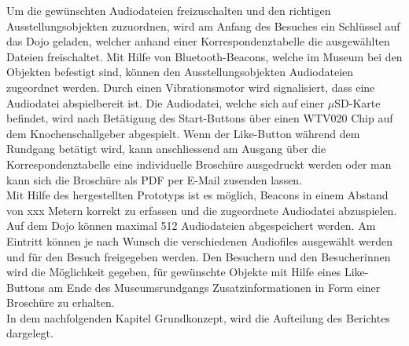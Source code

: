 Um die gewünschten Audiodateien freizuschalten und den richtigen Ausstellungsobjekten zuzuordnen, wird am Anfang des Besuches ein Schlüssel auf das Dojo geladen, welcher anhand einer Korrespondenztabelle die ausgewählten Dateien freischaltet. Mit Hilfe von Bluetooth-Beacons, welche im Museum bei den Objekten befestigt sind, können den Ausstellungsobjekten Audiodateien zugeordnet werden. Durch einen Vibrationsmotor wird signalisiert, dass eine Audiodatei abspielbereit ist. Die Audiodatei, welche sich auf einer $\mu$SD-Karte befindet, wird nach Betätigung des Start-Buttons über einen WTV020 Chip auf dem Knochenschallgeber abgespielt. Wenn der Like-Button während dem Rundgang betätigt wird, kann anschliessend am Ausgang über die Korrespondenztabelle eine individuelle Broschüre ausgedruckt werden oder man kann sich die Broschüre als PDF per E-Mail zusenden lassen.\\

Mit Hilfe des hergestellten Prototyps ist es möglich, Beacons in einem Abstand von xxx Metern korrekt zu erfassen und die zugeordnete Audiodatei abzuspielen. Auf dem Dojo können maximal 512 Audiodateien abgespeichert werden. Am Eintritt können je nach Wunsch die verschiedenen Audiofiles ausgewählt werden und für den Besuch freigegeben werden. Den Besuchern und den Besucherinnen wird die Möglichkeit gegeben, für gewünschte Objekte mit Hilfe eines Like-Buttons am Ende des Museumsrundgangs Zusatzinformationen in Form einer Broschüre zu erhalten.\\
 
In dem nachfolgenden Kapitel Grundkonzept, wird die Aufteilung des Berichtes dargelegt. 

